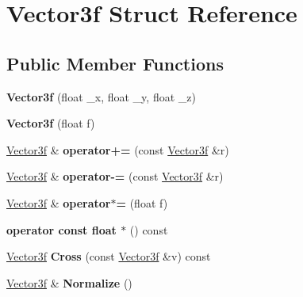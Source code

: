 \hypertarget{structVector3f}{\section{Vector3f Struct Reference}
\label{structVector3f}
}
\subsection*{Public Member Functions}
\begin{DoxyCompactItemize}
\item 
\hypertarget{structVector3f_ac2caf1fd41076826fe50b3a527ef90db}{{\bfseries Vector3f} (float \-\_\-x, float \-\_\-y, float \-\_\-z)}\label{structVector3f_ac2caf1fd41076826fe50b3a527ef90db}

\item 
\hypertarget{structVector3f_a0866ef2153242165a626102b48284b34}{{\bfseries Vector3f} (float f)}\label{structVector3f_a0866ef2153242165a626102b48284b34}

\item 
\hypertarget{structVector3f_abb9089cd5b410ea28b1d1db63fc550f8}{\hyperlink{structVector3f}{Vector3f} \& {\bfseries operator+=} (const \hyperlink{structVector3f}{Vector3f} \&r)}\label{structVector3f_abb9089cd5b410ea28b1d1db63fc550f8}

\item 
\hypertarget{structVector3f_a63ec561fd67ea011aa973c0549d48a26}{\hyperlink{structVector3f}{Vector3f} \& {\bfseries operator-\/=} (const \hyperlink{structVector3f}{Vector3f} \&r)}\label{structVector3f_a63ec561fd67ea011aa973c0549d48a26}

\item 
\hypertarget{structVector3f_a0449c07194a079d3eb57961e374e96ee}{\hyperlink{structVector3f}{Vector3f} \& {\bfseries operator$\ast$=} (float f)}\label{structVector3f_a0449c07194a079d3eb57961e374e96ee}

\item 
\hypertarget{structVector3f_af7cb77a7d58c931f103cd8d160e765c6}{{\bfseries operator const float $\ast$} () const }\label{structVector3f_af7cb77a7d58c931f103cd8d160e765c6}

\item 
\hypertarget{structVector3f_aa08a1a02eb2e991f26231edeb0811acf}{\hyperlink{structVector3f}{Vector3f} {\bfseries Cross} (const \hyperlink{structVector3f}{Vector3f} \&v) const }\label{structVector3f_aa08a1a02eb2e991f26231edeb0811acf}

\item 
\hypertarget{structVector3f_a6a0691180fe77995945f2a864ff0d1d6}{\hyperlink{structVector3f}{Vector3f} \& {\bfseries Normalize} ()}\label{structVector3f_a6a0691180fe77995945f2a864ff0d1d6}


\end{DoxyCompactItemize}
